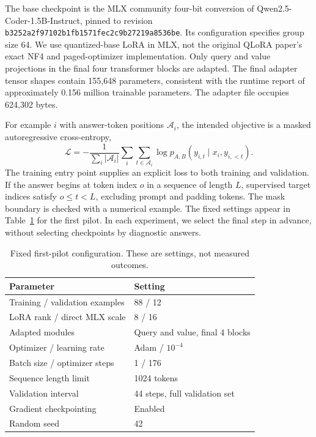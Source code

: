 \documentclass[11pt]{article}
\begin{document}
The base checkpoint is the MLX community four-bit conversion of
Qwen2.5-Coder-1.5B-Instruct, pinned to revision
\texttt{b3252a2f97102b1fb1571fec2c9b27219a8536be}.
Its configuration specifies group size 64. We use quantized-base LoRA in MLX,
not the original QLoRA paper's exact NF4 and paged-optimizer implementation.
Only query and value projections in the final four transformer blocks are
adapted. The final adapter tensor shapes contain 155,648 parameters,
consistent with the runtime report of approximately 0.156 million trainable
parameters. The adapter file occupies 624,302 bytes.

For example $i$ with answer-token positions $\mathcal A_i$, the intended
objective is a masked autoregressive cross-entropy,
\begin{equation}
 \mathcal L=-\frac{1}{\sum_i |\mathcal A_i|}
 \sum_i\sum_{t\in\mathcal A_i}
 \log p_{A,B}(y_{i,t}\mid x_i,y_{i,<t}).
\end{equation}
The training entry point supplies an explicit loss to both training and
validation. If the answer begins at token index $o$ in a sequence of length
$L$, supervised target indices satisfy $o\leq t<L$, excluding prompt and
padding tokens. The mask boundary is checked with a numerical example.
The fixed settings appear in
Table~\ref{tab:settings} for the first pilot. In each experiment, we select the final step in advance, without
selecting checkpoints by diagnostic answers.

\begin{table}[ht]
\centering
\caption{Fixed first-pilot configuration. These are settings, not measured outcomes.}
\label{tab:settings}
\begin{tabular}{ll}
\toprule
Parameter & Setting \\
\midrule
Training / validation examples & 88 / 12 \\
LoRA rank / direct MLX scale & 8 / 16 \\
Adapted modules & Query and value, final 4 blocks \\
Optimizer / learning rate & Adam / $10^{-4}$ \\
Batch size / optimizer steps & 1 / 176 \\
Sequence length limit & 1024 tokens \\
Validation interval & 44 steps, full validation set \\
Gradient checkpointing & Enabled \\
Random seed & 42 \\
\bottomrule
\end{tabular}
\end{table}
\end{document}
